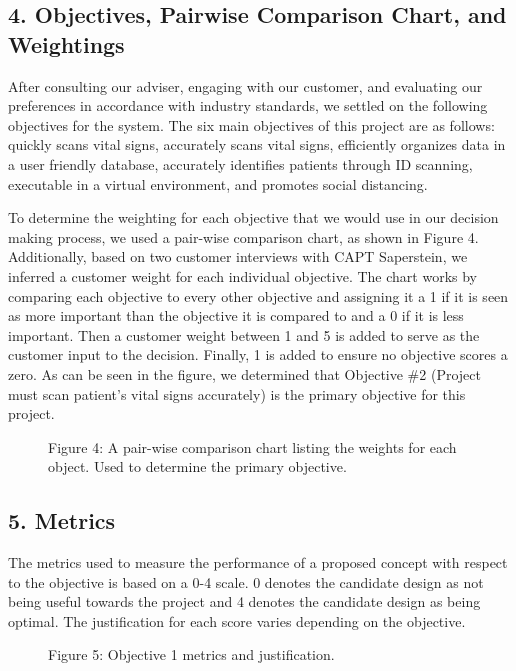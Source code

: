 ﻿\documentclass[10pt]{article}
\begin{document}
\subsection{4. Objectives, Pairwise Comparison Chart, and Weightings}
After consulting our adviser, engaging with our customer, and evaluating our preferences in accordance with industry standards, we settled on the following objectives for the system. The six main objectives of this project are as follows: quickly scans vital signs, accurately scans vital signs, efficiently organizes data in a user friendly database, accurately identifies patients through ID scanning, executable in a virtual environment, and promotes social distancing. 
        
To determine the weighting for each objective that we would use in our decision making process, we used a pair-wise comparison chart, as shown in Figure 4. Additionally, based on two customer interviews with CAPT Saperstein, we inferred a customer weight for each individual objective. The chart works by comparing each objective to every other objective and assigning it a 1 if it is seen as more important than the objective it is compared to and a 0 if it is less important. Then a customer weight between 1 and 5 is added to serve as the customer input to the decision. Finally, 1 is added to ensure no objective scores a zero. As can be seen in the figure, we determined that Objective \#2 (Project must scan patient’s vital signs accurately) is the primary objective for this project. 

%
\begin{figure}
\caption{Figure 4: A pair-wise comparison chart listing the weights for each object. Used to determine the primary objective.}
\label{fig:4}
\end{figure}
 
\subsection{5. Metrics}
The metrics used to measure the performance of a proposed concept with respect to the objective is based on a 0-4 scale. 0 denotes the candidate design as not being useful towards the project and 4 denotes the candidate design as being optimal. The justification for each score varies depending on the objective. 
%
%	
\begin{figure}
\caption{Figure 5: Objective 1 metrics and justification.}
\label{fig:5}
\end{figure}
\end{document}
